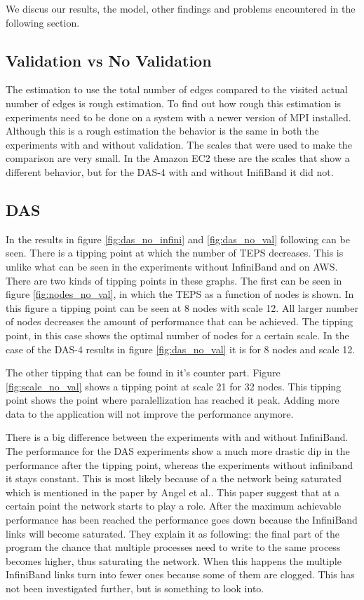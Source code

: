We discus our results, the model, other findings and problems encountered in the following section.

\subsection{Validation vs No Validation}
\label{dis:val}
The estimation to use the total number of edges compared to the visited actual number of edges is rough estimation. To find out how rough this estimation is experiments need to be done on a system with a newer version of MPI installed. Although this is a rough estimation the behavior is the same in both the experiments with and without validation.
The scales that were used to make the comparison are very small. In the Amazon EC2 these are the scales that show a different behavior, but for the DAS-4 with and without InifiBand it did not. 

\subsection{DAS}
In the results in figure \ref{fig:das_no_infini} and  \ref{fig:das_no_val} following can be seen. There is a tipping point at which the number of TEPS decreases. This is unlike what can be seen in the experiments without InfiniBand and on AWS. There are two kinds of tipping points in these graphs. The first can be seen in  figure \ref{fig:nodes_no_val}, in which the TEPS as a function of nodes is shown. In this figure a tipping point can be seen at 8 nodes with scale 12. All larger number of nodes decreases the amount of performance that can be achieved. The tipping point, in this case shows the optimal number of nodes for a certain scale. In the case of the DAS-4 results in figure \ref{fig:das_no_val} it is for 8 nodes and scale 12.

The other tipping that can be found in it's counter part. Figure \ref{fig:scale_no_val} shows a tipping point at scale 21 for 32 nodes. This tipping point shows the point where paralellization has reached it peak. Adding more data to the application will not improve the performance anymore. 

There is a big difference between the experiments with and without InfiniBand. The performance for the DAS experiments show a much more drastic dip in the performance after the tipping point, whereas the experiments without infiniband it stays constant. This is most likely because of a the network being saturated which is mentioned in the paper by Angel et al.\cite{angel2012graph}. This paper suggest that at a certain point the network starts to play a role.  After the maximum achievable performance has been reached the performance goes down because the InfiniBand links will become saturated. They explain it as following: the final part of the program the chance that multiple processes need to write to the same process becomes higher, thus saturating the network. When this happens the multiple InfiniBand links turn into fewer ones because some of them are clogged. This has not been investigated further, but is something to look into. 

